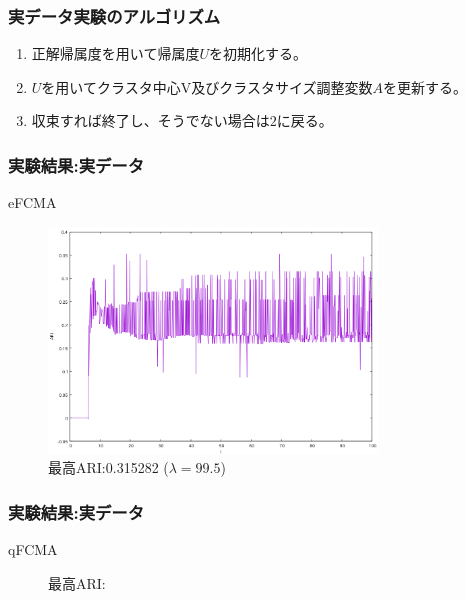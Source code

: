 \documentclass[13pt,dvipdfmx]{beamer}
\begin{document}
\begin{frame}\frametitle{実データ実験のアルゴリズム}
  \begin{enumerate}
  \item 正解帰属度を用いて帰属度$U$を初期化する。
  \item $U$を用いてクラスタ中心V及びクラスタサイズ調整変数$A$を更新する。
  \item 収束すれば終了し、そうでない場合は$2$に戻る。
  \end{enumerate}
\end{frame}

\begin{frame}\frametitle{実験結果:実データ}
  \begin{block}{eFCMA}
    \begin{figure}[htbp]
      \begin{center}
        \includegraphics[height=60mm]{efcma_ARI.png}
      \end{center}
      \captionsetup{labelformat=empty,labelsep=none}
      \caption{最高ARI:0.315282 ($\lambda=99.5$)}
    \end{figure}
  \end{block}
\end{frame}


\begin{frame}\frametitle{実験結果:実データ}
  \begin{block}{qFCMA}
    \begin{figure}[htbp]
      \begin{center}
      \end{center}
      \captionsetup{labelformat=empty,labelsep=none}
      \caption{最高ARI:}
    \end{figure}
  \end{block}
\end{frame}
\end{document}

